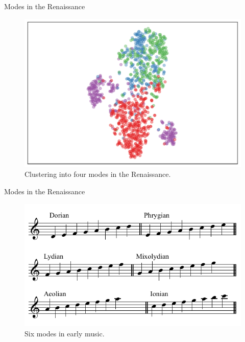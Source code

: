 \begin{frame}{Modes in the Renaissance}
    \begin{figure}
        \centering
        \includegraphics[width=\linewidth,height=.7\textheight,keepaspectratio]{img/Figure6.pdf}
        \caption{Clustering into four modes in the Renaissance.}
    \end{figure}
\end{frame}

\begin{frame}{Modes in the Renaissance}
    \begin{figure}
        \centering
        \includegraphics[width=.6\linewidth]{img/renaissance_modes.png}
        \caption{Six modes in early music.}
    \end{figure}
\end{frame}

